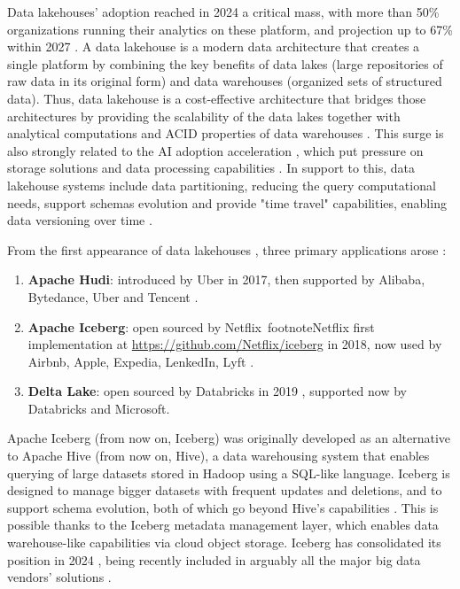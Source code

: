 Data lakehouses' adoption reached in 2024 a critical mass, with more than 50\% organizations running their analytics on these platform, and projection up to 67\% within 2027 \cite{StateDataLakehouse2025}. A data lakehouse is a modern data architecture that creates a single platform by combining the key benefits of data lakes (large repositories of raw data in its original form) and data warehouses (organized sets of structured data). Thus, data lakehouse is a cost-effective architecture \cite{DatalakehouseCostEfficiency} that bridges those architectures by providing the scalability of the data lakes together with analytical computations and \gls{ACID} properties of data warehouses \cite{lakehouse2021}. This surge is also strongly related to the AI adoption acceleration \cite{SurgeAI2024}, which put pressure on storage solutions and data processing capabilities \cite{StateDataLakehouse2025}. In support to this, data lakehouse systems include data partitioning, reducing the query computational needs, support schemas evolution and provide "time travel" capabilities, enabling data versioning over time \cite{crociDataLakehouseHype2022}.

From the first appearance of data lakehouses \cite{WhatLakehouse2020}, three primary applications arose \cite{ApacheHudiVs}: 
\begin{enumerate} 
    \item \textbf{Apache Hudi}: introduced by Uber in 2017, then supported by Alibaba, Bytedance, Uber and Tencent \cite{rajaperumalUberEngineeringIncremental2017}.
    \item \textbf{Apache Iceberg}: open sourced by Netflix~footnote{Netflix first implementation at \url{https://github.com/Netflix/iceberg}} in 2018, now used by Airbnb, Apple, Expedia, LenkedIn, Lyft \cite{IcebergExamples2024}.
    \item \textbf{Delta Lake}: open sourced by Databricks in 2019 \cite{armbrustDeltaLakeHighperformance2020}, supported now by Databricks and Microsoft.
\end{enumerate}

Apache Iceberg (from now on, Iceberg) was originally developed as an alternative to Apache Hive (from now on, Hive), a data warehousing system that enables querying of large datasets stored in Hadoop using a \gls{SQL}-like language. Iceberg is designed to manage bigger datasets with frequent updates and deletions, and to support schema evolution, both of which go beyond Hive's capabilities \cite{shiranApacheIcebergDefinitive2024}. This is possible thanks to the Iceberg metadata management layer, which enables data warehouse-like capabilities via cloud object storage. Iceberg has consolidated its position in 2024 \cite{IcebergNewHadoop}, being recently included in arguably all the major big data vendors' solutions \cite{BigDataVendorIceberg}.

